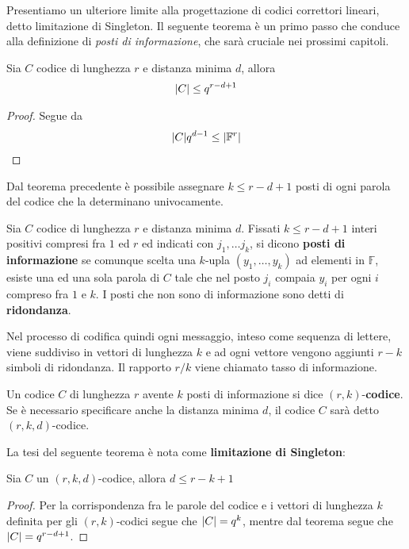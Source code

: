 Presentiamo un ulteriore limite alla progettazione di codici correttori lineari, detto limitazione di Singleton. Il seguente teorema è un primo passo che conduce alla definizione di \emph{posti di informazione}, che sarà cruciale nei prossimi capitoli.
\begin{teorema}\label{cap2_1:teolimitecodici}
   Sia $C$ codice di lunghezza $r$ e distanza minima $d$, allora 
   \begin{align*}
      \arrowvert C \arrowvert \leq q^{r-d+1}
   \end{align*}
\end{teorema}
\begin{proof}
   Segue da 
   \begin{align*}
      \arrowvert C \arrowvert q^{d-1} \leq \arrowvert \mathbb{F}^{r} \arrowvert
   \end{align*}
\end{proof}
\noindent
Dal teorema precedente è possibile assegnare $k \leq r-d+1$ posti di ogni parola del codice che la determinano univocamente. 
\begin{definizione}
   Sia $C$ codice di lunghezza $r$ e distanza minima $d$. Fissati $k \leq r-d+1$ interi positivi compresi fra $1$ ed $r$ ed indicati con $j_1, \dots j_k$, si dicono {\bf posti di informazione} se comunque scelta una $k$-upla $(y_1,\dots , y_k)$ ad elementi in $\mathbb{F}$, esiste una ed una sola parola di $C$ tale che nel posto $j_i$ compaia $y_i$ per ogni $i$ compreso fra $1$ e $k$. I posti che non sono di informazione sono detti di {\bf ridondanza}.
\end{definizione}
\noindent
Nel processo di codifica quindi ogni messaggio, inteso come sequenza di lettere, viene suddiviso in vettori di lunghezza $k$ e ad ogni vettore vengono aggiunti $r-k$ simboli di ridondanza. Il rapporto $r/k$ viene chiamato tasso di informazione.
\begin{definizione}
   Un codice $C$ di lunghezza $r$ avente $k$ posti di informazione si dice $(r,k)$-{\bf codice}. Se è necessario specificare anche la distanza minima $d$, il codice $C$ sarà detto $(r,k,d)$-codice.
\end{definizione}
\noindent
La tesi del seguente teorema è nota come {\bf limitazione di Singleton}:
\begin{teorema}
   Sia $C$ un $(r,k,d)$-codice, allora $d\leq r-k+1$
\end{teorema}
\begin{proof}
   Per la corrispondenza fra le parole del codice e i vettori di lunghezza $k$ definita per gli $(r,k)$-codici segue che $\arrowvert C \arrowvert = q^k$, mentre dal teorema segue che $\arrowvert C \arrowvert = q^{r-d+1}$.
\end{proof}


